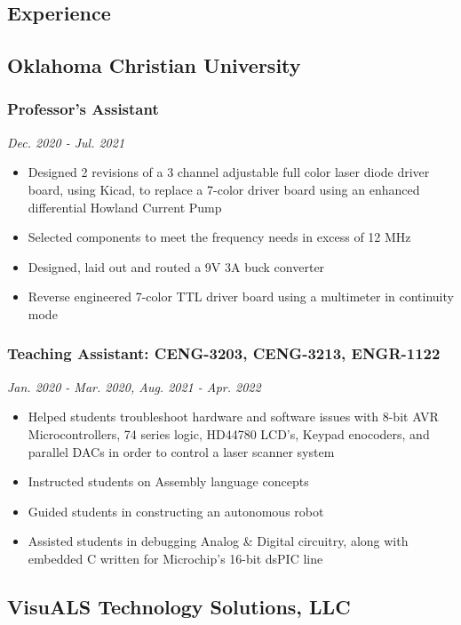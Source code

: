 \documentclass{article}
\begin{document}
\begin{spacing}{.5}
\section{Experience}
	\subsection{Oklahoma Christian University}
		\subsubsection{\large{Professor's Assistant}} \hfill \small{\textsl{Dec. 2020 - Jul. 2021}}
			\begin{itemize}[label=--,itemsep=-.35ex]
				\item \large{Designed 2 revisions of a 3 channel adjustable full color laser diode driver board, using Kicad, to replace a 7-color driver board using an enhanced differential Howland Current Pump}
				\item \large{Selected components to meet the frequency needs in excess of 12 MHz}
				\item \large{Designed, laid out and routed a 9V 3A buck converter}
				\item \large{Reverse engineered 7-color TTL driver board using a multimeter in continuity mode}
			\end{itemize}
		\subsubsection{\large{Teaching Assistant: CENG-3203, CENG-3213, ENGR-1122}} \hfill \small{\textsl{Jan. 2020 - Mar. 2020, Aug. 2021 - Apr. 2022}}
			\begin{itemize}[label=--,itemsep=-.35ex]
				\item \large{Helped students troubleshoot hardware and software issues with 8-bit AVR Microcontrollers, 74 series logic, HD44780 LCD's, Keypad enocoders, and parallel DACs in order to control a laser scanner system}
				\item \large{Instructed students on Assembly language concepts}
				\item \large{Guided students in constructing an autonomous robot}
				\item \large{Assisted students in debugging Analog \& Digital circuitry, along with embedded C written for Microchip's 16-bit dsPIC line}
			\end{itemize}
	\subsection{VisuALS Technology Solutions, LLC}

\end{spacing}
\end{document}
